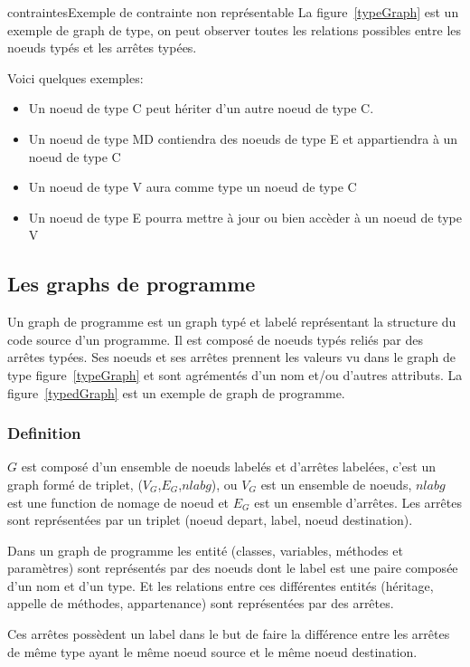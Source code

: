 \documentclass[a4paper, 12pt]{article}
\begin{document}
\begin{figu}{contraintes}{Exemple de contrainte non représentable}
  La figure~\ref{typeGraph} est un exemple de graph de type, on peut observer toutes les relations possibles entre les noeuds typés et les arrêtes typées.

  Voici quelques exemples:
  \begin{itemize}[label=\textbullet]
    \item Un noeud de type C peut hériter d'un autre noeud de type C.
    \item Un noeud de type MD contiendra des noeuds de type E et appartiendra à un noeud de type C
    \item Un noeud de type V aura comme type un noeud de type C
    \item Un noeud de type E pourra mettre à jour ou bien accèder à un noeud de type V
  \end{itemize}


  \subsection{Les graphs de programme}

  Un graph de programme est un graph typé et labelé représentant la structure du code source d'un programme. Il est composé de noeuds typés reliés par des arrêtes typées. Ses noeuds et ses arrêtes prennent les valeurs vu dans le graph de type figure~\ref{typeGraph} et sont agrémentés d'un nom et/ou d'autres attributs. La figure~\ref{typedGraph} est un exemple de graph de programme.

  \subsubsection{Definition}
  \(G \) est composé d'un ensemble de noeuds labelés et d'arrêtes labelées, c'est un graph formé de triplet, ({$V_G$},{$E_G$},\(nlabg \)), ou {$V_G$} est un ensemble de noeuds, \(nlabg \) est une function de nomage de noeud et {$E_G$} est un ensemble d'arrêtes. Les arrêtes sont représentées par un triplet (noeud depart, label, noeud destination).

  Dans un graph de programme les entité (classes, variables, méthodes et paramètres) sont représentés par des noeuds dont le label est une paire composée d'un nom et d'un type. Et les relations entre ces différentes entités (héritage, appelle de méthodes, appartenance) sont représentées par des arrêtes.

  Ces arrêtes possèdent un label dans le but de faire la différence entre les arrêtes de même type ayant le même noeud source et le même noeud destination.


\end{figu}
\end{document}
